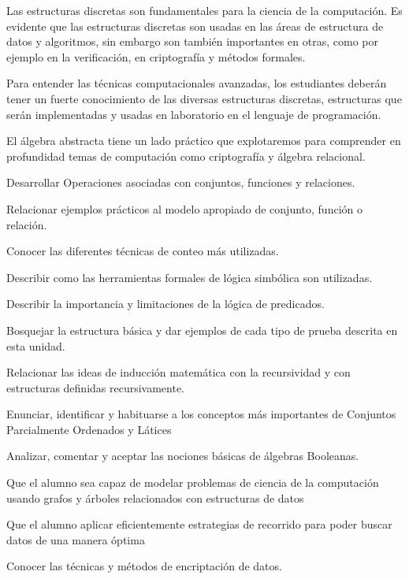 \begin{syllabus}


\begin{justification}
Las estructuras discretas son fundamentales para la ciencia de la computación. Es evidente que las estructuras discretas son usadas en las áreas de estructura de datos y algoritmos, sin embargo son también importantes en otras, como por ejemplo en la verificación, en criptografía y métodos formales.

Para entender las técnicas computacionales avanzadas, los estudiantes deberán tener un fuerte conocimiento de las diversas estructuras discretas, estructuras que serán implementadas y usadas en laboratorio en el lenguaje de programación.

El álgebra abstracta tiene un lado práctico que explotaremos para comprender en profundidad temas de computación como criptografía y álgebra relacional.
\end{justification}

\begin{goals}
\item Desarrollar Operaciones asociadas con conjuntos, funciones y relaciones.
\item Relacionar ejemplos prácticos al modelo apropiado de conjunto, función o relación.
\item Conocer las diferentes técnicas de conteo más utilizadas.
\item Describir como las herramientas formales de lógica simbólica son utilizadas.
\item Describir la importancia y limitaciones de la lógica de predicados.
\item Bosquejar la estructura básica y dar ejemplos de cada tipo de prueba descrita en esta unidad.
\item Relacionar las ideas de inducción matemática con la recursividad y con estructuras definidas recursivamente.
\item Enunciar, identificar y habituarse a los conceptos más importantes de Conjuntos Parcialmente Ordenados y Látices
\item Analizar, comentar y aceptar las nociones básicas de álgebras Booleanas.
\item Que el alumno sea capaz de modelar problemas de ciencia de la computación usando grafos y árboles relacionados con estructuras de datos
\item Que el alumno aplicar eficientemente estrategias de recorrido para poder buscar datos de una manera óptima
\item Conocer las técnicas y métodos de encriptación de datos.
\end{goals}


\end{syllabus}
